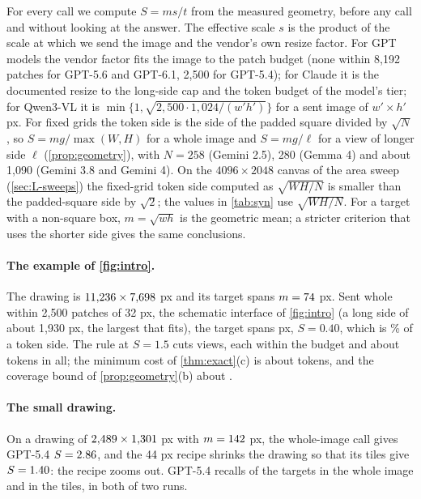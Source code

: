 For every call we compute $S = ms/t$ from the measured geometry, before any call and without looking at the answer. The effective scale $s$ is the product of the scale at which we send the image and the vendor's own resize factor. For GPT models the vendor factor fits the image to the patch budget (none within 8{,}192 patches for GPT-5.6 and GPT-6.1, 2{,}500 for GPT-5.4); for Claude it is the documented resize to the long-side cap and the token budget of the model's tier; for Qwen3-VL it is $\min\{1, \sqrt{2{,}500 \cdot 1{,}024/(w'h')}\}$ for a sent image of $w' \times h'$ px. For fixed grids the token side is the side of the padded square divided by $\sqrt N$, so $S = mg/\max(W,H)$ for a whole image and $S = mg/\ell$ for a view of longer side $\ell$ (\cref{prop:geometry}), with $N = 258$ (Gemini 2.5), 280 (Gemma 4) and about 1{,}090 (Gemini 3.8 and Gemini 4). On the $4096 \times 2048$ canvas of the area sweep (\cref{sec:L-sweeps}) the fixed-grid token side computed as $\sqrt{WH/N}$ is smaller than the padded-square side by $\sqrt 2$; the values in \cref{tab:syn} use $\sqrt{WH/N}$. For a target with a non-square box, $m = \sqrt{wh}$ is the geometric mean; a stricter criterion that uses the shorter side gives the same conclusions.

\paragraph{The example of \cref{fig:intro}.} The drawing is $11{,}236 \times 7{,}698$ px and its target spans $m = 74$ px. Sent whole within 2{,}500 patches of 32 px, the schematic interface of \cref{fig:intro} (a long side of about 1{,}930 px, the largest that fits), the target spans \CfigMsent{} px, $S = 0.40$, which is \CfigPctToken\% of a token side. The rule at $S = 1.5$ cuts \CfigViews{} views, each within the budget and about \CfigTokens{} tokens in all; the minimum cost of \cref{thm:exact}(c) is about \CfigCmin{} tokens, and the coverage bound of \cref{prop:geometry}(b) about \CfigPropB.

\paragraph{The small drawing.} On a drawing of $2{,}489 \times 1{,}301$ px with $m = 142$ px, the whole-image call gives GPT-5.4 $S = 2.86$, and the 44 px recipe shrinks the drawing so that its tiles give $S = 1.40$: the recipe zooms out. GPT-5.4 recalls \CsmallRecWhole{} of the targets in the whole image and \CsmallRecTile{} in the tiles, in both of two runs.

